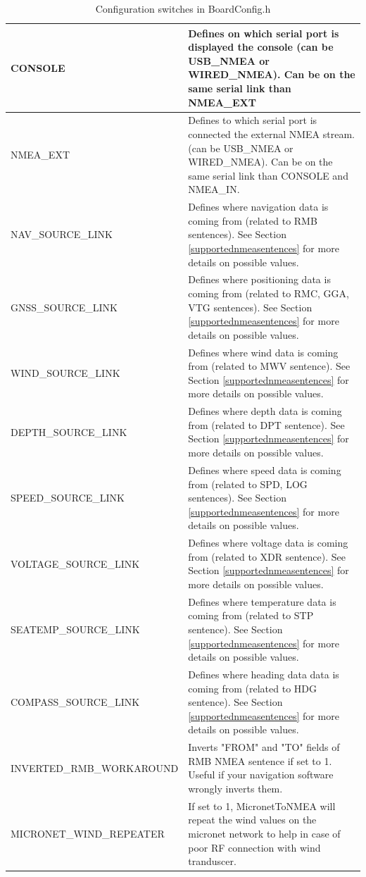 \documentclass{report}
\begin{document}
\begin{table}[h]
\begin{tabular}{|l|p{10cm}|}
		\hline
		CONSOLE & Defines on which serial port is displayed the console (can be USB\_NMEA or WIRED\_NMEA). Can be on the same serial link than NMEA\_EXT\\
		\hline
		NMEA\_EXT & Defines to which serial port is connected the external NMEA stream. (can be USB\_NMEA or WIRED\_NMEA). Can be on the same serial link than CONSOLE and NMEA\_IN.\\
		\hline
		NAV\_SOURCE\_LINK & Defines where navigation data is coming from (related to RMB sentences). See Section {\ref{supportednmeasentences}} for more details on possible values.\\
		\hline
		GNSS\_SOURCE\_LINK & Defines where positioning data is coming from (related to RMC, GGA, VTG sentences). See Section {\ref{supportednmeasentences}} for more details on possible values.\\
		\hline
		WIND\_SOURCE\_LINK & Defines where wind data is coming from (related to MWV sentence). See Section {\ref{supportednmeasentences}} for more details on possible values.\\
		\hline
		DEPTH\_SOURCE\_LINK & Defines where depth data is coming from (related to DPT sentence). See Section {\ref{supportednmeasentences}} for more details on possible values.\\
		\hline
		SPEED\_SOURCE\_LINK & Defines where speed data is coming from (related to SPD, LOG sentences). See Section {\ref{supportednmeasentences}} for more details on possible values.\\
		\hline
		VOLTAGE\_SOURCE\_LINK & Defines where voltage data is coming from (related to XDR sentence). See Section {\ref{supportednmeasentences}} for more details on possible values.\\
		\hline
		SEATEMP\_SOURCE\_LINK & Defines where temperature data is coming from (related to STP sentence). See Section {\ref{supportednmeasentences}} for more details on possible values.\\
		\hline
		COMPASS\_SOURCE\_LINK & Defines where heading data data is coming from (related to HDG sentence). See Section {\ref{supportednmeasentences}} for more details on possible values.\\
		\hline
		INVERTED\_RMB\_WORKAROUND & Inverts "FROM" and "TO" fields of RMB NMEA sentence if set to 1. Useful if your navigation software wrongly inverts them.\\
		\hline
		MICRONET\_WIND\_REPEATER & If set to 1, MicronetToNMEA will repeat the wind values on the micronet network to help in case of poor RF connection with wind tranduscer.\\
		\hline
\end{tabular}
	\caption{Configuration switches in BoardConfig.h}
\label{table:configswitches}
\end{table}
\end{document}
